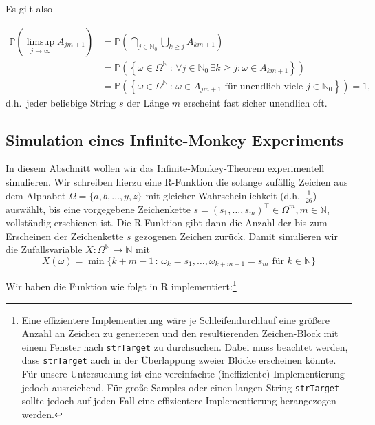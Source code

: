 \documentclass[10pt,]{article}
\let\rmarkdownfootnote\footnote%
\def\footnote{\protect\rmarkdownfootnote}
\begin{document}
Es gilt also

\[
\begin{aligned}
\mathbb{P} \left( \limsup_{j \to \infty} A_{jm+1} \right) &= \mathbb{P} \left( \bigcap_{j \in \mathbb{N}_0} \bigcup_{k \geq j} A_{km+1} \right) \\
&= \mathbb{P} \left( \left\{ \omega \in \Omega^{\mathbb{N}}  \, : \, \forall j \in \mathbb{N}_0 \, \exists k \geq j : \omega \in A_{km+1} \right\} \right) \\
&= \mathbb{P} \left( \left\{ \omega \in \Omega^{\mathbb{N}}  \, : \, \omega \in A_{jm+1} \text{ für unendlich viele } j \in \mathbb{N}_0 \right\} \right) = 1,
\end{aligned}
\] d.h.~jeder beliebige String \(s\) der Länge \(m\) erscheint fast
sicher unendlich oft.

\subsection{Simulation eines Infinite-Monkey
Experiments}\label{simulation-eines-infinite-monkey-experiments}

In diesem Abschnitt wollen wir das Infinite-Monkey-Theorem experimentell
simulieren. Wir schreiben hierzu eine R-Funktion die solange zufällig
Zeichen aus dem Alphabet \(\Omega = \{a, b, \ldots, y, z\}\) mit
gleicher Wahrscheinlichkeit (d.h.~\(\frac{1}{26}\)) auswählt, bis eine
vorgegebene Zeichenkette
\(s = (s_1, \ldots, s_m)^\top \in \Omega^m, m \in \mathbb{N},\)
vollständig erschienen ist. Die R-Funktion gibt dann die Anzahl der bis
zum Erscheinen der Zeichenkette \(s\) gezogenen Zeichen zurück. Damit
simulieren wir die Zufallsvariable
\(X: \Omega^{\mathbb{N}} \to \mathbb{N}\) mit \[ 
X(\omega) = \min\{k+m-1 \, : \, \omega_k = s_1, \ldots, \omega_{k+m-1} = s_m \text{ für } k \in \mathbb{N} \}
\]

Wir haben die Funktion wie folgt in R implementiert:\footnote{Eine
  effizientere Implementierung wäre je Schleifendurchlauf eine größere
  Anzahl an Zeichen zu generieren und den resultierenden Zeichen-Block
  mit einem Fenster nach \texttt{strTarget} zu durchsuchen. Dabei muss
  beachtet werden, dass \texttt{strTarget} auch in der Überlappung
  zweier Blöcke erscheinen könnte. Für unsere Untersuchung ist eine
  vereinfachte (ineffiziente) Implementierung jedoch ausreichend. Für
  große Samples oder einen langen String \texttt{strTarget} sollte
  jedoch auf jeden Fall eine effizientere Implementierung herangezogen
  werden.}

\newpage
\end{document}
